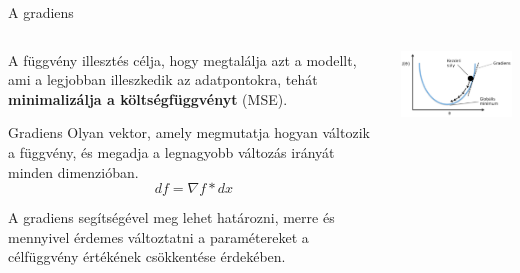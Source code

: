 \documentclass[english, aspectratio=169]{beamer}
\begin{document}
\begin{frame}{A gradiens}
	\begin{columns}
		\begin{column}{.5\textwidth}
			A függvény illesztés célja, hogy megtalálja azt a modellt, ami a legjobban illeszkedik az adatpontokra, tehát \textbf{minimalizálja a költségfüggvényt} (MSE). 
			\begin{block}{Gradiens}
				Olyan vektor, amely megmutatja hogyan változik a függvény, és megadja a legnagyobb változás irányát minden dimenzióban.
				\vspace{-0.25cm}
				\[
				df = \nabla f * dx
				\]
			\end{block} 
			A gradiens segítségével meg lehet határozni, merre és mennyivel érdemes változtatni a paramétereket a célfüggvény értékének csökkentése érdekében.
		\end{column}
		\begin{column}{.5\textwidth}
			\begin{center}
				\includegraphics[width=7.5cm, keepaspectratio]{images/ql_12.png}
			\end{center}
		\end{column}
	\end{columns}
\end{frame}
\end{document}
